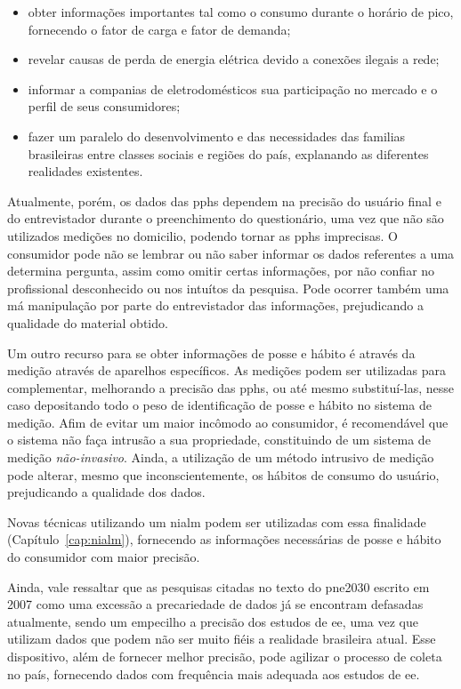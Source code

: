 \begin{itemize}
\item obter informações importantes tal como o consumo durante o horário de pico,
fornecendo o fator de carga e fator de demanda;
\item revelar causas de perda de energia elétrica devido a conexões ilegais a
rede;
\item informar a companias de eletrodomésticos sua participação no mercado e 
o perfil de seus consumidores;
\item fazer um paralelo do desenvolvimento e das necessidades das familias 
brasileiras entre classes sociais e regiões do país, explanando as 
diferentes realidades existentes.
\end{itemize}

Atualmente, porém, os dados das \glspl{pph} dependem
na precisão do usuário final e do entrevistador durante 
o preenchimento do questionário, uma vez que não são utilizados 
medições no domicilio, podendo tornar as \glspl{pph}
imprecisas. O consumidor pode não se lembrar ou não saber informar os dados
referentes a uma determina pergunta, assim como omitir certas informações, 
por não confiar no profissional desconhecido ou nos intuítos da pesquisa.
Pode ocorrer também uma má manipulação por parte do entrevistador das
informações, prejudicando a qualidade do material obtido.

Um outro recurso para se obter informações de posse e hábito é através da medição 
através de aparelhos específicos. As medições podem ser utilizadas para
complementar, melhorando a precisão das \glspl{pph}, ou até mesmo substituí-las,
nesse caso depositando todo o peso de identificação de posse e hábito 
no sistema de medição. Afim de evitar um maior incômodo ao consumidor, é 
recomendável que o sistema não faça intrusão a sua propriedade, constituindo de 
um sistema de medição \emph{não-invasivo}. Ainda, a utilização de um método
intrusivo de medição pode alterar, mesmo que inconscientemente, os hábitos de consumo 
do usuário, prejudicando a qualidade dos dados.

Novas técnicas utilizando um \gls{nialm} podem ser 
utilizadas com essa finalidade (Capítulo~\ref{cap:nialm}), 
fornecendo as informações necessárias de posse e hábito do consumidor 
com maior precisão. 

Ainda, vale ressaltar que as pesquisas citadas no texto do \gls{pne2030} escrito 
em 2007 como uma excessão a precariedade de dados já se encontram defasadas 
atualmente, sendo um empecilho a precisão dos estudos de \gls{ee}, uma vez 
que utilizam dados que podem não ser muito fiéis a realidade brasileira atual. 
Esse dispositivo, além de fornecer melhor precisão, pode agilizar o processo 
de coleta no país, fornecendo dados com frequência mais adequada aos estudos 
de \gls{ee}. 
